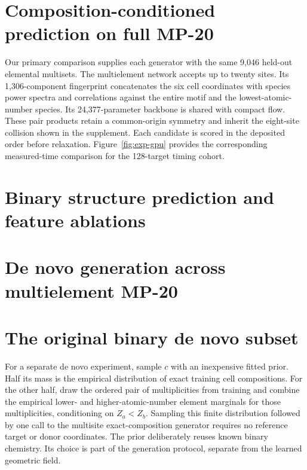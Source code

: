 \documentclass[10pt]{article}
\begin{document}
\section{Composition-conditioned prediction on full MP-20}
Our primary comparison supplies each generator with the same 9,046 held-out elemental multisets. The multielement network accepts up to twenty sites. Its 1,306-component fingerprint concatenates the six cell coordinates with species power spectra and correlations against the entire motif and the lowest-atomic-number species. Its 24,377-parameter backbone is shared with compact flow. These pair products retain a common-origin symmetry and inherit the eight-site collision shown in the supplement. Each candidate is scored in the deposited order before relaxation. Figure~\ref{fig:exp-gpu} provides the corresponding measured-time comparison for the 128-target timing cohort.






\section{Binary structure prediction and feature ablations}






\section{De novo generation across multielement MP-20}\label{sec:multi-denovo}





\section{The original binary de novo subset}\label{sec:denovo}
For a separate de novo experiment, sample $c$ with an inexpensive fitted prior. Half its mass is the empirical distribution of exact training cell compositions. For the other half, draw the ordered pair of multiplicities from training and combine the empirical lower- and higher-atomic-number element marginals for those multiplicities, conditioning on $Z_a<Z_b$. Sampling this finite distribution followed by one call to the multisite exact-composition generator requires no reference target or donor coordinates. The prior deliberately reuses known binary chemistry. Its choice is part of the generation protocol, separate from the learned geometric field.
\end{document}

